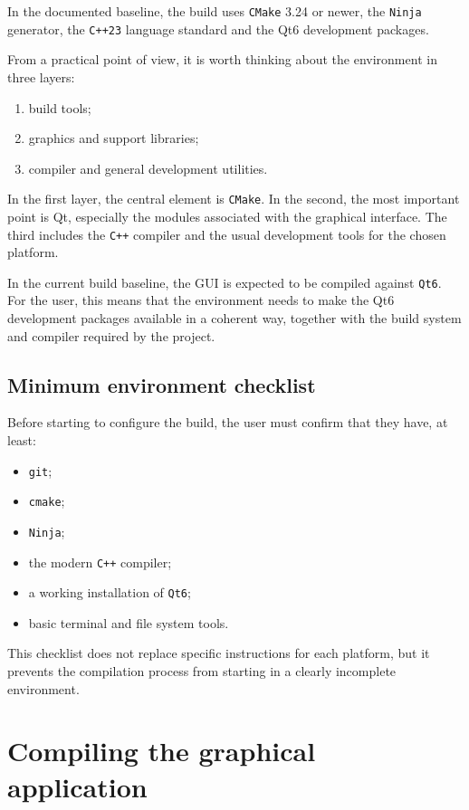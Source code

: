 In the documented baseline, the build uses \texttt{CMake} 3.24 or newer, the \texttt{Ninja} generator, the \texttt{C++23} language standard and the Qt6 development packages.

From a practical point of view, it is worth thinking about the environment in three layers:

\begin{enumerate}
\item build tools;
\item graphics and support libraries;
\item compiler and general development utilities.
\end{enumerate}

In the first layer, the central element is \texttt{CMake}. In the second, the most important point is Qt, especially the modules associated with the graphical interface. The third includes the \texttt{C++} compiler and the usual development tools for the chosen platform.

In the current build baseline, the GUI is expected to be compiled against \texttt{Qt6}. For the user, this means that the environment needs to make the Qt6 development packages available in a coherent way, together with the build system and compiler required by the project.

\subsection{Minimum environment checklist}
\label{subsec:cap2_checklist_minimo_ambiente}

Before starting to configure the build, the user must confirm that they have, at least:
\begin{itemize}
\item \texttt{git};
\item \texttt{cmake};
\item \texttt{Ninja};
\item the modern \texttt{C++} compiler;
\item a working installation of \texttt{Qt6};
\item basic terminal and file system tools.
\end{itemize}

This checklist does not replace specific instructions for each platform, but it prevents the compilation process from starting in a clearly incomplete environment.

\section{Compiling the graphical application}
\label{sec:cap2_compilando_aplicacao_grafica}

